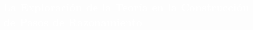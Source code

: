 \begin{titlepage}
\pagecolor{white}
\newcommand{\R}{\ensuremath{\mathbb{R}}}
\BgThispage
{}
\vspace*{-1.1cm}
\noindent
\def\titulo#1{\section{#1}}

\section{\bf\large\textcolor{white}{La Exploraci\'on de la Teor\'ia en la Construcci\'on de Pasos de Razonamiento}}
\vspace*{2cm}\par
\noindent


\end{titlepage}

